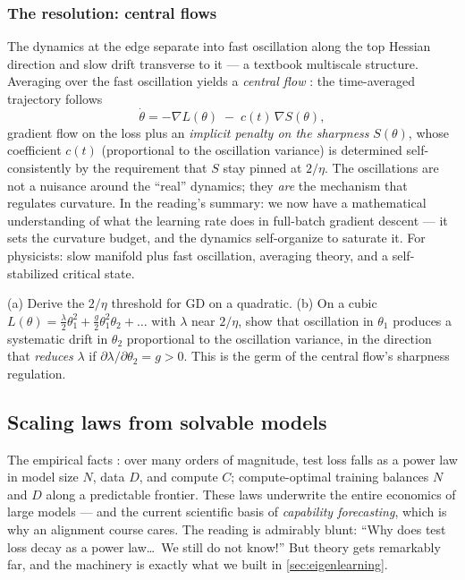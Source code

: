 \documentclass[11pt]{article}
\begin{document}
\subsubsection{The resolution: central flows}

The dynamics at the edge separate into fast oscillation along the top
Hessian direction and slow drift transverse to it --- a textbook multiscale
structure. Averaging over the fast oscillation yields a \emph{central flow}
\cite{cohen2025understanding}: the time-averaged trajectory follows
\begin{equation}
  \dot\theta = -\nabla L(\theta) \;-\; c(t)\,\nabla S(\theta),
\end{equation}
gradient flow on the loss plus an \emph{implicit penalty on the sharpness}
$S(\theta)$, whose coefficient $c(t)$ (proportional to the oscillation
variance) is determined self-consistently by the requirement that $S$ stay
pinned at $2/\eta$. The oscillations are not a nuisance around the ``real''
dynamics; they \emph{are} the mechanism that regulates curvature. In the
reading's summary: we now have a mathematical understanding of what the
learning rate does in full-batch gradient descent --- it sets the curvature
budget, and the dynamics self-organize to saturate it. For physicists: slow
manifold plus fast oscillation, averaging theory, and a self-stabilized
critical state.

\begin{exercise}
\label{ex:eos}
(a) Derive the $2/\eta$ threshold for GD on a quadratic. (b) On a cubic
$L(\theta) = \tfrac{\lambda}{2}\theta_1^2 + \tfrac{g}{2}\theta_1^2\theta_2
+ \dots$ with $\lambda$ near $2/\eta$, show that oscillation in $\theta_1$
produces a systematic drift in $\theta_2$ proportional to the oscillation
variance, in the direction that \emph{reduces} $\lambda$ if
$\partial\lambda/\partial\theta_2 = g > 0$. This is the germ of the central
flow's sharpness regulation.
\end{exercise}

\subsection{Scaling laws from solvable models}
\label{sec:scaling}

The empirical facts \cite{kaplan2020scaling,hoffmann2022training}: over many
orders of magnitude, test loss falls as a power law in model size $N$, data
$D$, and compute $C$; compute-optimal training balances $N$ and $D$ along a
predictable frontier. These laws underwrite the entire economics of large
models --- and the current scientific basis of \emph{capability forecasting},
which is why an alignment course cares. The reading is admirably blunt:
``Why does test loss decay as a power law\dots\ We still do not know!'' But
theory gets remarkably far, and the machinery is exactly what we built in
\cref{sec:eigenlearning}.
\end{document}
